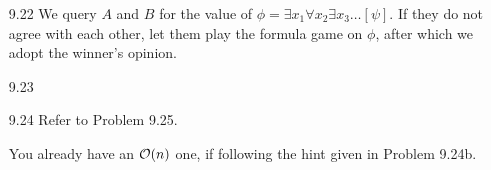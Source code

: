 \begin{itemize}
	\item[9.22]
	We query $A$ and $B$ for the value of $\phi = \exists x_1 \forall x_2 \exists x_3 \dots [\psi]$. If they do not agree with each other, let them play the formula game on $\phi$, after which we adopt the winner's opinion.
	
	\item[9.23]
	\Empty
	
	\item[9.24]
	Refer to Problem 9.25.
	
	\item[\Star 9.25]
	You already have an $\mathcal{O}(n)$ one, if following the hint given in Problem 9.24b.
	
\end{itemize}